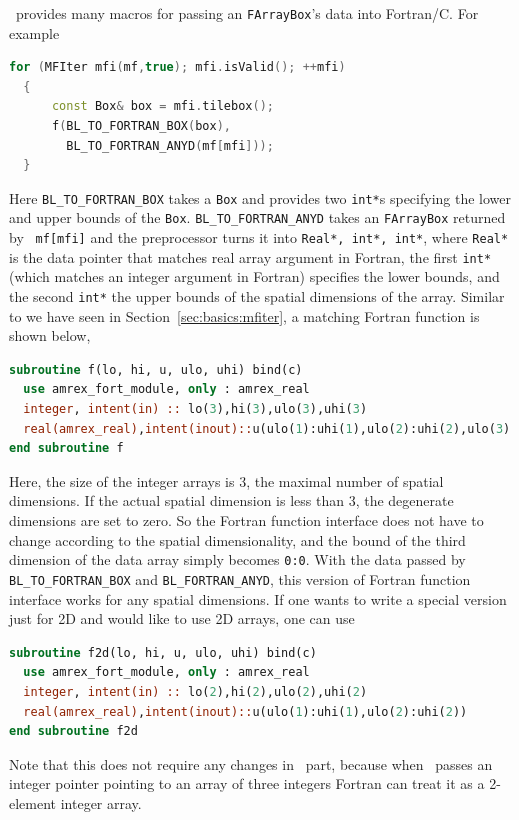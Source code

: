 {{{\amrex\ provides many macros for passing an {\tt FArrayBox}'s data
into Fortran/C.  For example
\begin{lstlisting}[language=cpp]
  for (MFIter mfi(mf,true); mfi.isValid(); ++mfi)
  {
      const Box& box = mfi.tilebox();
      f(BL_TO_FORTRAN_BOX(box),
        BL_TO_FORTRAN_ANYD(mf[mfi]));
  }
\end{lstlisting}
Here {\tt BL\_TO\_FORTRAN\_BOX} takes a {\tt Box} and provides two
{\tt int*}s specifying the lower and upper bounds of the {\tt Box}.
{\tt BL\_TO\_FORTRAN\_ANYD} takes an {\tt FArrayBox} returned by {\tt
  mf[mfi]} and the preprocessor turns it into {\tt Real*, int*, int*},
where {\tt Real*} is the data pointer that matches real array argument
in Fortran, the first {\tt int*} (which matches an integer argument in
Fortran) specifies the lower bounds, and the second {\tt int*} the
upper bounds of the spatial dimensions of the array.  Similar to we
have seen in Section~\ref{sec:basics:mfiter}, a matching Fortran
function is shown below,
\begin{lstlisting}[language=fortran]
subroutine f(lo, hi, u, ulo, uhi) bind(c)
  use amrex_fort_module, only : amrex_real
  integer, intent(in) :: lo(3),hi(3),ulo(3),uhi(3)
  real(amrex_real),intent(inout)::u(ulo(1):uhi(1),ulo(2):uhi(2),ulo(3):uhi(3))
end subroutine f
\end{lstlisting}
Here, the size of the integer arrays is 3, the maximal number of
spatial dimensions.  If the actual spatial dimension is less than 3,
the degenerate dimensions are set to zero.  So the Fortran function
interface does not have to change according to the spatial
dimensionality, and the bound of the third dimension of the data array
simply becomes {\tt 0:0}.  With the data passed by {\tt
  BL\_TO\_FORTRAN\_BOX} and {\tt BL\_FORTRAN\_ANYD}, this version of
Fortran function interface works for any spatial dimensions.  If one
wants to write a special version just for 2D and would like to use 2D
arrays, one can use
\begin{lstlisting}[language=fortran]
subroutine f2d(lo, hi, u, ulo, uhi) bind(c)
  use amrex_fort_module, only : amrex_real
  integer, intent(in) :: lo(2),hi(2),ulo(2),uhi(2)
  real(amrex_real),intent(inout)::u(ulo(1):uhi(1),ulo(2):uhi(2))
end subroutine f2d
\end{lstlisting}
Note that this does not require any changes in \cpp\ part, because
when \cpp\ passes an integer pointer pointing to an array of three
integers Fortran can treat it as a 2-element integer array.

}}}
